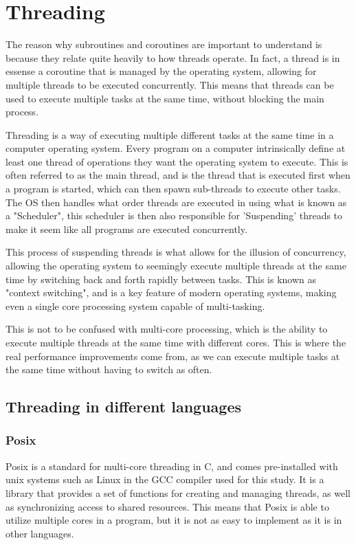 \documentclass[12pt,a4paper]{article}
\begin{document}
\section{Threading}

The reason why subroutines and coroutines are important to understand is because they relate quite heavily to how threads operate. In fact, a thread is in essense a coroutine that is managed by the operating system, allowing for multiple threads to be executed concurrently. This means that threads can be used to execute multiple tasks at the same time, without blocking the main process.

Threading is a way of executing multiple different tasks at the same time in a computer operating system. Every program on a computer intrinsically define at least one thread of operations they want the operating system to execute. This is often referred to as the main thread, and is the thread that is executed first when a program is started, which can then spawn sub-threads to execute other tasks. The OS then handles what order threads are executed in using what is known as a "Scheduler", this scheduler is then also responsible for 'Suspending' threads to make it seem like all programs are executed concurrently. 

This process of suspending threads is what allows for the illusion of concurrency, allowing the operating system to seemingly execute multiple threads at the same time by switching back and forth rapidly between tasks. This is known as "context switching", and is a key feature of modern operating systems, making even a single core processing system capable of multi-tasking.

This is not to be confused with multi-core processing, which is the ability to execute multiple threads at the same time with different cores. This is where the real performance improvements come from, as we can execute multiple tasks at the same time without having to switch as often.

\subsection{Threading in different languages}

\subsubsection{Posix}

Posix is a standard for multi-core threading in C, and comes pre-installed with unix systems such as Linux in the GCC compiler used for this study. It is a library that provides a set of functions for creating and managing threads, as well as synchronizing access to shared resources. This means that Posix is able to utilize multiple cores in a program, but it is not as easy to implement as it is in other languages.
\end{document}
